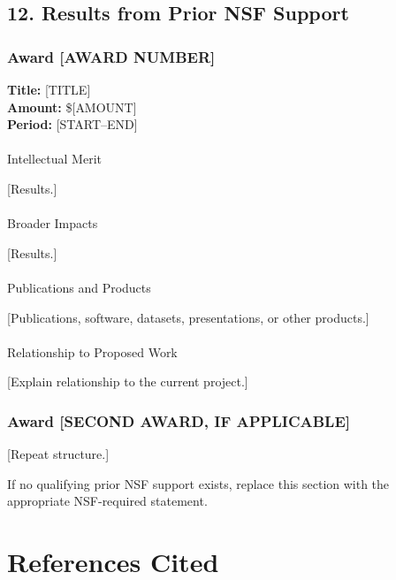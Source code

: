 \documentclass[
  11pt,
  letterpaper,
]{article}
\makeatletter
\let\oldparagraph\paragraph
\renewcommand{\paragraph}{
    \@ifstar
      \xxxParagraphStar
      \xxxParagraphNoStar
  }
\newcommand{\xxxParagraphStar}[1]{\oldparagraph*{#1}\mbox{}}
\newcommand{\xxxParagraphNoStar}[1]{\oldparagraph{#1}\mbox{}}
\makeatother
\begin{document}
\subsection{12. Results from Prior NSF
Support}\label{results-from-prior-nsf-support}

\subsubsection{Award {[}AWARD NUMBER{]}}\label{award-award-number}

\textbf{Title:} {[}TITLE{]}\\
\textbf{Amount:} \${[}AMOUNT{]}\\
\textbf{Period:} {[}START--END{]}

\paragraph{Intellectual Merit}\label{intellectual-merit-2}

{[}Results.{]}

\paragraph{Broader Impacts}\label{broader-impacts-3}

{[}Results.{]}

\paragraph{Publications and Products}\label{publications-and-products}

{[}Publications, software, datasets, presentations, or other
products.{]}

\paragraph{Relationship to Proposed
Work}\label{relationship-to-proposed-work}

{[}Explain relationship to the current project.{]}

\subsubsection{Award {[}SECOND AWARD, IF
APPLICABLE{]}}\label{award-second-award-if-applicable}

{[}Repeat structure.{]}

If no qualifying prior NSF support exists, replace this section with the
appropriate NSF-required statement.

\section{References Cited}\label{references-cited}

\renewcommand{\bibsection}{}

\end{document}
